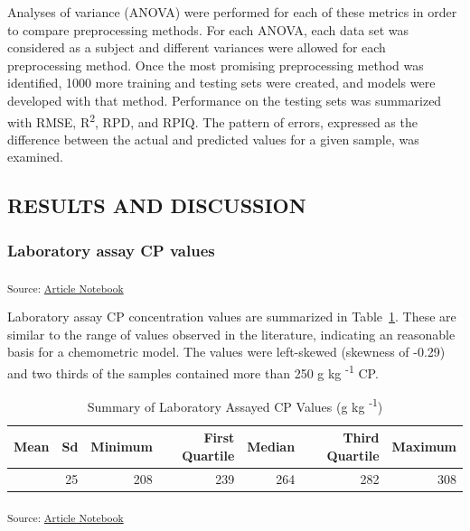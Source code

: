\documentclass[
]{agujournal2019}
\begin{document}
Analyses of variance (ANOVA) were performed for each of these metrics in
order to compare preprocessing methods. For each ANOVA, each data set
was considered as a subject and different variances were allowed for
each preprocessing method. Once the most promising preprocessing method
was identified, 1000 more training and testing sets were created, and
models were developed with that method. Performance on the testing sets
was summarized with RMSE, R\textsuperscript{2}, RPD, and RPIQ. The
pattern of errors, expressed as the difference between the actual and
predicted values for a given sample, was examined.

\subsection{RESULTS AND DISCUSSION}\label{results-and-discussion}

\subsubsection{Laboratory assay CP
values}\label{laboratory-assay-cp-values}

\textsubscript{Source:
\href{https://rvcrawford.github.io/glowing-system/index.qmd.html}{Article
Notebook}}

Laboratory assay CP concentration values are summarized in
Table~\ref{tbl-lab-protein-vals}. These are similar to the range of
values observed in the literature, indicating an reasonable basis for a
chemometric model. The values were left-skewed (skewness of -0.29) and
two thirds of the samples contained more than 250 g kg
\textsuperscript{-1} CP.

\begin{longtable}[]{@{}rrrrrrr@{}}

\caption{\label{tbl-lab-protein-vals}Summary of Laboratory Assayed CP
Values (g kg \textsuperscript{-1})}

\tabularnewline

\toprule\noalign{}
Mean & Sd & Minimum & First Quartile & Median & Third Quartile &
Maximum \\
\midrule\noalign{}
\endhead
\bottomrule\noalign{}
\endlastfoot
261 & 25 & 208 & 239 & 264 & 282 & 308 \\

\end{longtable}

\textsubscript{Source:
\href{https://rvcrawford.github.io/glowing-system/index.qmd.html}{Article
Notebook}}
\end{document}
